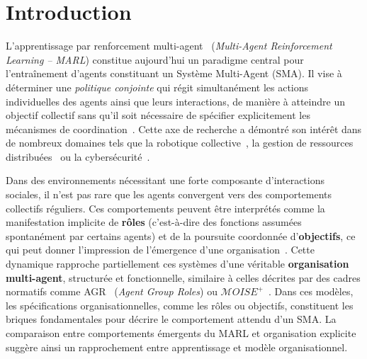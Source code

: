 \documentclass[francais,ROIA,Unicode,manuscript]{cedram}
\title
[MOISE+MARL]
{MOISE+MARL : un cadre organisationnel pour l’explicabilité et le contrôle en apprentissage par renforcement multi-agent \textsuperscript{(1)}}
\author{\firstname{Julien} \lastname{Soulé}}
\author{\firstname{Michel} \lastname{Occello}}
\author{\firstname{Jean-Paul} \lastname{Jamont}}
\author{\firstname{Louis-Marie} \lastname{Traonouez}}
\author{\firstname{Paul} \lastname{Théron}}
\begin{document}
\maketitle


\section{Introduction}


\noindent
L'apprentissage par renforcement multi-agent~\cite{maisonhaute2024} (\textit{Multi-Agent Reinforcement Learning -- MARL}) constitue aujourd'hui un paradigme central pour l'entraînement d'agents constituant un Système Multi-Agent (SMA). Il vise à déterminer une \emph{politique conjointe} qui régit simultanément les actions individuelles des agents ainsi que leurs interactions, de manière à atteindre un objectif collectif sans qu'il soit nécessaire de spécifier explicitement les mécanismes de coordination~\cite{Albrecht2024book}.
%
Cette axe de recherche a démontré son intérêt dans de nombreux domaines tels que la robotique collective~\cite{Wang2025}, la gestion de ressources distribuées~\cite{Chahoud2025} ou la cybersécurité~\cite{Hammar2023}.

\noindent
Dans des environnements nécessitant une forte composante d'interactions sociales, il n’est pas rare que les agents convergent vers des comportements collectifs réguliers. Ces comportements peuvent être interprétés comme la manifestation implicite de \textbf{rôles} (c’est-à-dire des fonctions assumées spontanément par certains agents) et de la poursuite coordonnée d’\textbf{objectifs}, ce qui peut donner l’impression de l’émergence d’une organisation~\cite{Foerster2016}.
%
Cette dynamique rapproche partiellement ces systèmes d’une véritable \textbf{organisation multi-agent}, structurée et fonctionnelle, similaire à celles décrites par des cadres normatifs comme AGR~\cite{ferber2003} (\textit{Agent Group Roles}) ou $\mathcal{M}OISE^+$~\cite{Hubner2007}. Dans ces modèles, les spécifications organisationnelles, comme les rôles ou objectifs, constituent les briques fondamentales pour décrire le comportement attendu d’un SMA. La comparaison entre comportements émergents du MARL et organisation explicite suggère ainsi un rapprochement entre apprentissage et modèle organisationnel.
\end{document}
